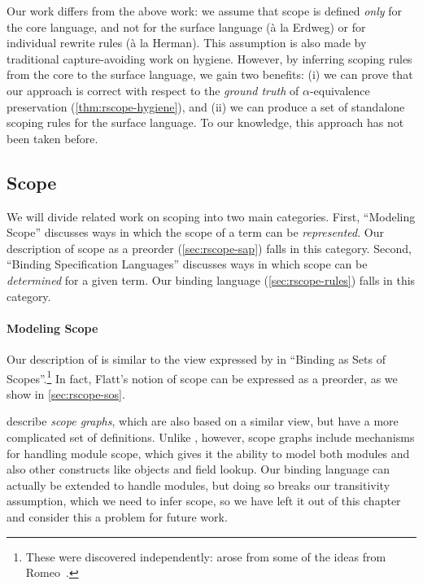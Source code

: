 Our work differs from the above work: we assume that scope is defined
\emph{only} for the core language, and not for the
surface language (\`a la Erdweg) or for individual rewrite rules (\`a la Herman).
This assumption is also made by traditional capture-avoiding work on
hygiene. However, by inferring scoping rules from the core to
the surface language, we gain two benefits: (i) we can prove that our
approach is correct with respect to the \emph{ground truth} of
$\alpha$-equivalence preservation (\cref{thm:rscope-hygiene}), and (ii)
we can produce a set of standalone scoping rules for the surface
language. To our knowledge, this approach has not been taken before.


\subsection{Scope}

We will divide related work on scoping into two main categories.
First, ``Modeling Scope'' discusses ways in which the scope of a term
can be \emph{represented}. Our description of scope as a
preorder (\cref{sec:rscope-sap}) falls in this category.
Second, ``Binding Specification Languages'' discusses ways in which scope
can be \emph{determined} for a given term. Our binding
language (\cref{sec:rscope-rules}) falls in this category.

\paragraph{Modeling Scope}

Our description of {\sap} is similar to the view
expressed by \cite{flatt:scope} in ``Binding as Sets of Scopes''.\footnote{
  These were discovered independently: {\sap} arose from some
  of the ideas from Romeo~\cite{stansifer-romeo}.
}
In fact, Flatt's notion of scope can be expressed as a preorder,
as we show in \cref{sec:rscope-sos}.

\cite{neron-scope} describe \emph{scope graphs}, which are also based on a
similar view, but have a more complicated set of definitions.
Unlike {\sap}, however, scope graphs include mechanisms for handling
module scope, which gives it the ability to model both modules and
also other constructs like objects and field lookup.
Our {\sap} binding language can actually be extended to
handle modules, but doing so breaks our transitivity
assumption, which we need to infer scope, so we have left it out of
this chapter and consider this a problem for
future work.

